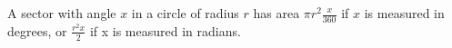 A sector with angle $x$ in a circle of radius $r$ has area
$ \pi r ^2 \frac{x}{360} $ if $x$ is measured in degrees,
or $\frac{r^{2}x}{2}$  if x is measured in radians.